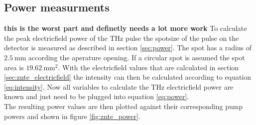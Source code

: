 \subsection{Power measurments}
\FloatBarrier
\textbf{this is the worst part and definetly needs a lot more work}
To calculate the peak electricfield power of the $\si{\tera\hertz}$ pulse the spotsize of the pulse on the detector is measured as described in section \ref{sec:power}.
The spot has a radius of $\SI{2.5}{\milli\meter}$ according the aperature opening.
If a circular spot is assumed the spot area is $\SI{19.62}{\milli\meter\squared}$.
With the electricfield values that are calculated in section \ref{sec:znte_electricfield} the intensity can then be calculated according to equation \ref{eq:intensity}.
Now all variables to calculate the $\si{\tera\hertz}$ electricfield power are known and just need to be plugged into equation \ref{eq:power}.
\\
The resulting power values are then plotted against their corresponding pump powers and shown in figure \ref{fig:znte_power}.
